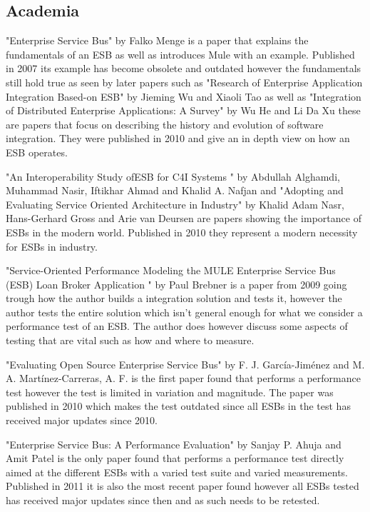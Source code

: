 \documentclass{llncs}
\begin{document}
\subsection{Academia}
"Enterprise Service Bus"\cite{falko07} by Falko Menge is a paper that explains the fundamentals of an ESB as well as introduces Mule with an example. Published in 2007 its example has become obsolete and outdated however the fundamentals still hold true as seen by later papers such as "Research of Enterprise Application Integration Based-on ESB" \cite{Jieming2010} by Jieming Wu and Xiaoli Tao as well as "Integration of Distributed Enterprise Applications: A Survey" \cite{HeIntegration} by Wu He and Li Da Xu these are papers that focus on describing the history and evolution of software integration. They were published in 2010 and give an in depth view on how an ESB  operates.


"An Interoperability  Study  ofESB for C4I  Systems " \cite{Alghamdi2010} by Abdullah Alghamdi, Muhammad Nasir, Iftikhar Ahmad and Khalid A. Nafjan and  "Adopting and Evaluating Service Oriented Architecture in Industry" by Khalid Adam Nasr, Hans-Gerhard Gross and Arie van Deursen are papers showing the importance of ESBs in the modern world. Published in 2010 they represent a modern necessity for ESBs in industry.


"Service-Oriented Performance Modeling the MULE Enterprise Service Bus (ESB) Loan Broker Application " \cite{Brebner2009} by Paul Brebner is a paper from 2009 going trough how the author builds a integration solution and tests it, however the author tests the entire solution which isn't general enough for what we consider a performance test of an ESB. The author does however discuss some aspects of testing that are vital such as how and where to measure.

"Evaluating Open Source Enterprise Service Bus" \cite{Garcia2010} by F. J. García-Jiménez and M. A. Martínez-Carreras, A. F. is the first paper found that performs a performance test however the test is limited in variation and magnitude. The paper was published in 2010 which makes the test outdated since all ESBs in the test has received major updates since 2010.


"Enterprise Service Bus: A Performance Evaluation" \cite{Sanjay2011} by Sanjay P. Ahuja and Amit Patel  is the only paper found that performs a performance test directly aimed at the different ESBs with a varied test suite and varied measurements. Published in 2011 it is also the most recent paper found however all ESBs tested has received major updates since then and as such needs to be retested.
\end{document}
